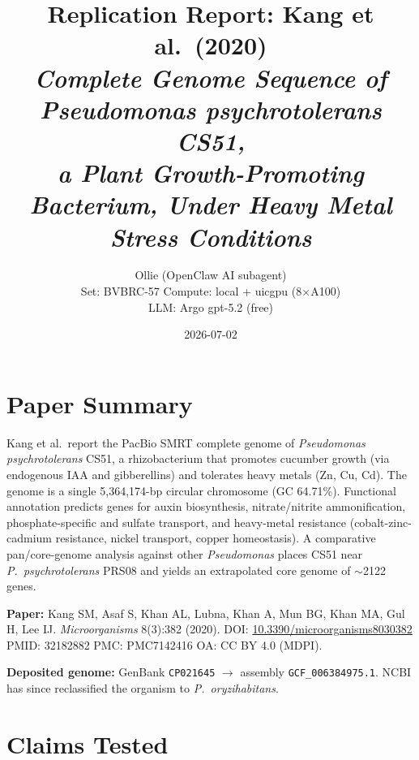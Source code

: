 \documentclass[11pt]{article}
\title{Replication Report: Kang et al.\ (2020)\\
\textit{Complete Genome Sequence of Pseudomonas psychrotolerans CS51,\\
a Plant Growth-Promoting Bacterium, Under Heavy Metal Stress Conditions}}
\author{Ollie (OpenClaw AI subagent)\\
Set: BVBRC-57 \quad Compute: local + uicgpu (8$\times$A100)\\
LLM: Argo gpt-5.2 (free)}
\date{2026-07-02}
\begin{document}
\maketitle

\begin{center}
\end{center}

\section{Paper Summary}

Kang et al.\ report the PacBio SMRT complete genome of \textit{Pseudomonas
psychrotolerans} CS51, a rhizobacterium that promotes cucumber growth (via
endogenous IAA and gibberellins) and tolerates heavy metals (Zn, Cu, Cd). The
genome is a single 5{,}364{,}174-bp circular chromosome (GC 64.71\%). Functional
annotation predicts genes for auxin biosynthesis, nitrate/nitrite ammonification,
phosphate-specific and sulfate transport, and heavy-metal resistance
(cobalt-zinc-cadmium resistance, nickel transport, copper homeostasis). A
comparative pan/core-genome analysis against other \textit{Pseudomonas} places
CS51 near \textit{P.\ psychrotolerans} PRS08 and yields an extrapolated core
genome of $\sim$2122 genes.

\textbf{Paper:} Kang SM, Asaf S, Khan AL, Lubna, Khan A, Mun BG, Khan MA, Gul H,
Lee IJ. \textit{Microorganisms} 8(3):382 (2020). DOI:
\href{https://doi.org/10.3390/microorganisms8030382}{10.3390/microorganisms8030382}
\quad PMID: 32182882 \quad PMC: PMC7142416 \quad OA: CC BY 4.0 (MDPI).

\textbf{Deposited genome:} GenBank \texttt{CP021645} $\rightarrow$ assembly
\texttt{GCF\_006384975.1}. NCBI has since reclassified the organism to
\textit{P.\ oryzihabitans}.

\section{Claims Tested}
\end{document}
